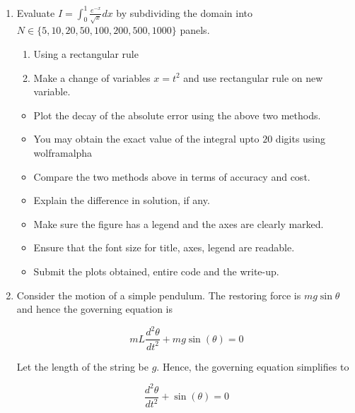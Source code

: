 \documentclass{article}
\begin{document}
\begin{enumerate}
            \item Evaluate $I = \displaystyle \int_{0}^{1} \frac{e^{-x}}{\sqrt{x}} dx$ by
            subdividing the domain into $N \in \{5, 10, 20, 50, 100, 200, 500, 1000\}$
            panels.

                \begin{enumerate}
                    \item Using a rectangular rule
                    \item Make a change of variables $x = t^{2}$ and use rectangular rule
                    on new variable.
                \end{enumerate}

                \begin{itemize}
                    \item Plot the decay of the absolute error using the above two
                    methods.
                    \item You may obtain the exact value of the integral upto $20$ digits
                    using wolframalpha
                    \item Compare the two methods above in terms of accuracy and cost.
                    \item Explain the difference in solution, if any.
                    \item Make sure the figure has a legend and the axes are clearly
                    marked.
                    \item Ensure that the font size for title, axes, legend are readable.
                    \item Submit the plots obtained, entire code and the write-up.
                \end{itemize}

            \item Consider the motion of a simple pendulum. The restoring force is $mg
            \sin \theta$ and hence the governing equation is

                \begin{equation*}
                    mL \frac{d^{2} \theta}{dt^{2}} + mg \sin(\theta) = 0
                \end{equation*}

                Let the length of the string be $g$. Hence, the governing equation
                simplifies to
                    
                \begin{equation*}
                    \frac{d^{2} \theta}{dt^{2}} + \sin(\theta) = 0
                \end{equation*}


\end{enumerate}
\end{document}
